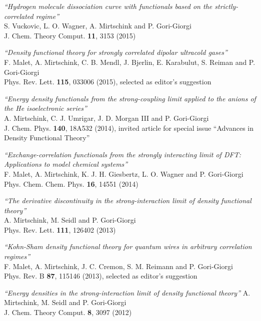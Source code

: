\documentclass[line,margin]{res}
\begin{document}
\begin{resume}
\begin{etaremune}
				\item {\sl ``Hydrogen molecule dissociation curve with functionals based on the strictly-correlated regime''}\\
				S. Vuckovic, L. O. Wagner, A. Mirtschink and P. Gori-Giorgi\\
				J. Chem. Theory Comput. \textbf{11}, 3153 (2015)
				
				\item {\sl ``Density functional theory for strongly correlated dipolar ultracold gases''}\\
				F. Malet, A. Mirtschink, C. B. Mendl, J. Bjerlin, E. Karabulut, S. Reiman and P. Gori-Giorgi\\
				Phys. Rev. Lett. \textbf{115}, 033006 (2015), selected as editor's suggestion
				
				\item {\sl ``Energy density functionals from the strong-coupling limit applied to the anions of the He isoelectronic series''}\\
				A. Mirtschink, C. J. Umrigar, J. D. Morgan III and P. Gori-Giorgi\\
				J. Chem. Phys. \textbf{140}, 18A532 (2014), invited article for special issue ``Advances in Density Functional Theory''

				\item {\sl ``Exchange-correlation functionals from the strongly interacting limit of DFT: Applications to model chemical systems''}\\
				F. Malet, A. Mirtschink, K. J. H. Giesbertz, L. O. Wagner and P. Gori-Giorgi\\
				Phys. Chem. Chem. Phys. \textbf{16}, 14551 (2014)

				\item {\sl ``The derivative discontinuity in the strong-interaction limit of density functional theory''}\\
				A. Mirtschink, M. Seidl and P. Gori-Giorgi\\
				Phys. Rev. Lett. \textbf{111}, 126402 (2013)        

				\item {\sl ``Kohn-Sham density functional theory for quantum wires in arbitrary correlation regimes''}\\
					F. Malet, A. Mirtschink, J. C. Cremon, S. M. Reimann and P. Gori-Giorgi\\
					Phys. Rev. B \textbf{87}, 115146 (2013), selected as editor's suggestion
					
				\item {\sl ``Energy densities in the strong-interaction limit of density functional theory''}
					A. Mirtschink, M. Seidl and P. Gori-Giorgi\\
					J. Chem. Theory Comput. \textbf{8}, 3097 (2012)
					

\end{etaremune}
\end{resume}
\end{document}
